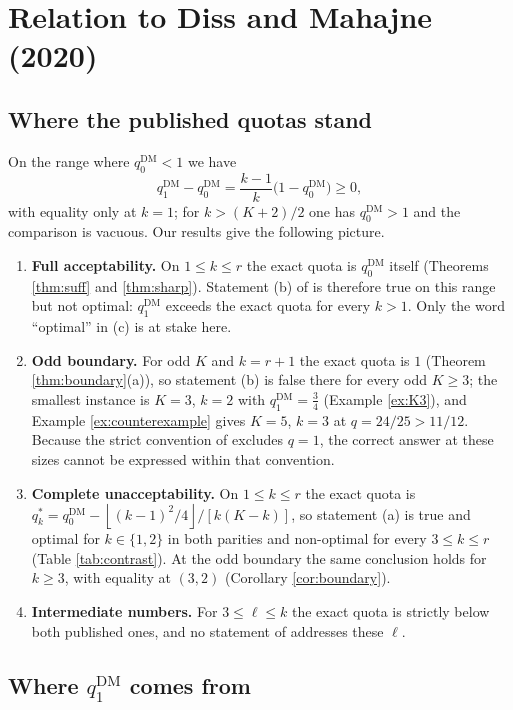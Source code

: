 \documentclass[11pt]{article}
\theoremstyle{plain}
\theoremstyle{definition}
\newcommand{\fl}[1]{\left\lfloor #1\right\rfloor}
\newcommand{\DM}{\mathrm{DM}}
\begin{document}
\section{Relation to Diss and Mahajne (2020)}
\label{sec:related}

\subsection{Where the published quotas stand}

On the range where $q_0^{\DM}<1$ we have
\[
q_1^{\DM}-q_0^{\DM}=\frac{k-1}{k}\bigl(1-q_0^{\DM}\bigr)\ge0,
\]
with equality only at $k=1$; for $k>(K+2)/2$ one has $q_0^{\DM}>1$ and the comparison is vacuous. Our results give the following picture.

\begin{enumerate}[label=(\roman*)]
\item \textbf{Full acceptability.} On $1\le k\le r$ the exact quota is $q_0^{\DM}$ itself (Theorems \ref{thm:suff} and \ref{thm:sharp}). Statement (b) of \cite{DissMahajne2020} is therefore true on this range but not optimal: $q_1^{\DM}$ exceeds the exact quota for every $k>1$. Only the word ``optimal'' in (c) is at stake here.
\item \textbf{Odd boundary.} For odd $K$ and $k=r+1$ the exact quota is $1$ (Theorem \ref{thm:boundary}(a)), so statement (b) is false there for every odd $K\ge3$; the smallest instance is $K=3$, $k=2$ with $q_1^{\DM}=\frac34$ (Example \ref{ex:K3}), and Example \ref{ex:counterexample} gives $K=5$, $k=3$ at $q=24/25>11/12$. Because the strict convention of \cite{DissMahajne2020} excludes $q=1$, the correct answer at these sizes cannot be expressed within that convention.
\item \textbf{Complete unacceptability.} On $1\le k\le r$ the exact quota is $q_k^*=q_0^{\DM}-\fl{(k-1)^2/4}/[k(K-k)]$, so statement (a) is true and optimal for $k\in\{1,2\}$ in both parities and non-optimal for every $3\le k\le r$ (Table \ref{tab:contrast}). At the odd boundary the same conclusion holds for $k\ge3$, with equality at $(3,2)$ (Corollary \ref{cor:boundary}).
\item \textbf{Intermediate numbers.} For $3\le\ell\le k$ the exact quota is strictly below both published ones, and no statement of \cite{DissMahajne2020} addresses these $\ell$.
\end{enumerate}

\subsection{Where $q_1^{\DM}$ comes from}
\label{sec:source}
\end{document}
